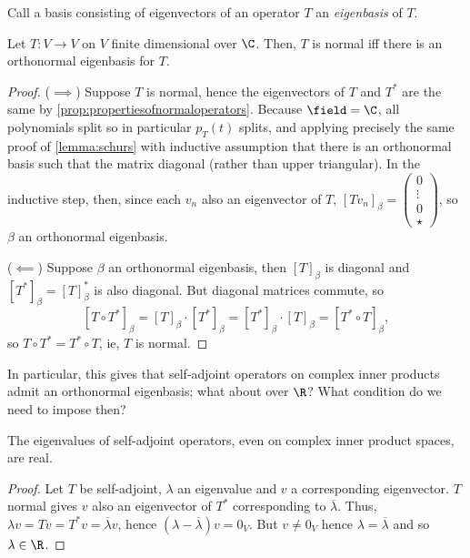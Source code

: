 \begin{definition}[Eigenbasis]
    Call a basis consisting of eigenvectors of an operator $T$ an \emph{eigenbasis} of $T$.
\end{definition}

\begin{theorem}
    Let $T : V\to V$ on $V$ finite dimensional over $\C$. Then, $T$ is normal iff there is an orthonormal eigenbasis for $T$.
\end{theorem}

\begin{proof}
    ($\implies$) Suppose $T$ is normal, hence the eigenvectors of $T$ and $T^\ast$ are the same by \cref{prop:propertiesofnormaloperators}. Because $\field  = \C$, all polynomials split so in particular $p_T(t)$ splits, and applying precisely the same proof of \cref{lemma:schurs} with inductive assumption that there is an orthonormal basis such that the matrix diagonal (rather than upper triangular). In the inductive step, then, since each $v_n$ also an eigenvector of $T$, $[Tv_n]_\beta = \begin{pmatrix}
        0 \\
        \vdots\\
        0\\
        \star
    \end{pmatrix}$, so $\beta$ an orthonormal eigenbasis.

    ($\impliedby$) Suppose $\beta$ an orthonormal eigenbasis, then $[T]_\beta$ is diagonal and $[T^\ast]_\beta = [T]_\beta^\ast$ is also diagonal. But diagonal matrices commute, so \[
    [T \circ T^\ast]_\beta = [T]_\beta \cdot [T^\ast]_\beta = [T^\ast]_\beta \cdot [T]_\beta = [T^\ast \circ T]_\beta,    
    \]
    so $T\circ T^\ast = T^\ast \circ T$, ie, $T$ is normal.
\end{proof}

In particular, this gives that self-adjoint operators on complex inner products admit an orthonormal eigenbasis; what about over $\R$? What condition do we need to impose then?

\begin{lemma}
    The eigenvalues of self-adjoint operators, even on complex inner product spaces, are real.
\end{lemma}

\begin{proof}
    Let $T$ be self-adjoint, $\lambda$ an eigenvalue and $v$ a corresponding eigenvector. $T$ normal gives $v$ also an eigenvector of $T^\ast$ corresponding to $\overline{\lambda}$. Thus, $\lambda v = Tv = T^\ast v = \overline{\lambda}v$, hence $(\lambda - \overline{\lambda})v = 0_V$. But $v \neq 0_V$ hence $\lambda = \overline{\lambda}$ and so $\lambda \in \R$.
\end{proof}

